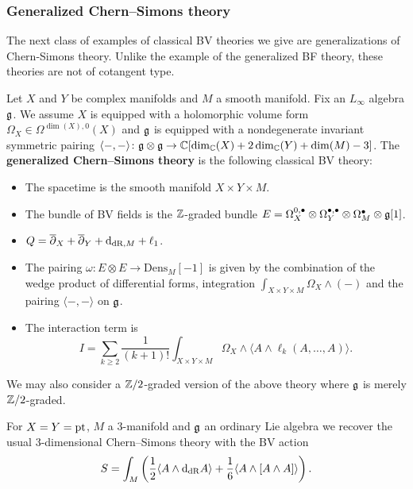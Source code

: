 \documentclass[10pt, oneside]{article}
\newcommand{\Dens}{\mathrm{Dens}}
\begin{document}

\subsubsection{Generalized Chern--Simons theory} \label{gen_CS_section}

The next class of examples of classical BV theories we give are generalizations of Chern-Simons theory. Unlike the example of the generalized BF theory, these theories are not of cotangent type.

\begin{definition}
Let $X$ and $Y$ be complex manifolds and $M$ a smooth manifold. Fix an $L_\infty$ algebra $\mathfrak g$. We assume $X$ is equipped with a holomorphic volume form $\Omega_X \in\Omega^{\dim(X), 0}(X)$ and $\mathfrak g$ is equipped with a nondegenerate invariant symmetric pairing $\langle-, -\rangle\colon \mathfrak g\otimes\mathfrak g\rightarrow \mathbb C[\dim_\mathbb C(X) + 2\dim_\mathbb C(Y) + \dim(M) - 3]$. The {\bf generalized Chern--Simons theory} is the following classical BV theory:
\begin{itemize}
\item The spacetime is the smooth manifold $X\times Y\times M$.

\item The bundle of BV fields is the $\mathbb Z$-graded bundle $E = \Omega^{0,\bullet}_X \otimes \Omega^{\bullet,\bullet}_Y \otimes \Omega^\bullet_M \otimes \mathfrak g[1]$.

\item $Q = \overline{\partial}_X + \overline{\partial}_Y + {\rm d}_{\mathrm{dR}, M} + \ell_1$.

\item The pairing $\omega\colon E\otimes E\rightarrow \Dens_M[-1]$ is given by the combination of the wedge product of differential forms, integration $\int_{X\times Y\times M} \Omega_X\wedge (-)$ and the pairing $\langle -, -\rangle$ on $\mathfrak g$.

\item The interaction term is
\[I = \sum_{k\geq 2}\frac{1}{(k+1)!} \int_{X\times Y\times M} \Omega_X\wedge \langle A\wedge \ell_k(A, \dots, A)\rangle.\]
\end{itemize}
\label{def:generalizedBF}
\end{definition}

We may also consider a $\mathbb Z/2$-graded version of the above theory where $\mathfrak g$ is merely $\mathbb Z/2$-graded.

\begin{example}
For $X=Y=\operatorname{pt}$, $M$ a 3-manifold and $\mathfrak g$ an ordinary Lie algebra we recover the usual 3-dimensional Chern--Simons theory with the BV action
\[S = \int_M \left(\frac{1}{2}\langle A\wedge {\rm d}_{\mathrm{dR}} A\rangle + \frac{1}{6}\langle A\wedge [A\wedge A]\rangle\right).\]
\end{example}
\end{document}
